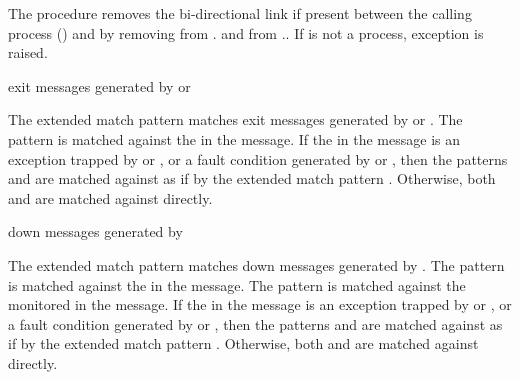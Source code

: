 \begin{procedure}
\end{procedure}
\returns{} 

The  procedure removes the bi-directional link if
present between the calling process () and  by
removing  from . and
 from ..  If  is not
a process, exception  is
raised.

\begin{match-extension}
\end{match-extension}
\matches{} exit messages generated by  or 

The extended match pattern 
matches exit messages generated by  or .
The pattern  is matched against the  in the message.
If the  in the message is
an exception trapped by  or , or
a fault condition generated by  or ,
then the patterns  and  are matched against
 as if by the extended match pattern
.
Otherwise, both  and  are matched against  directly.

\begin{match-extension}
\end{match-extension}
\matches{} down messages generated by 

The extended match pattern 
matches down messages generated by .
The pattern  is matched against the  in the message.
The pattern  is matched against the monitored  in the message.
If the  in the message is
an exception trapped by  or , or
a fault condition generated by  or ,
then the patterns  and  are matched against
 as if by the extended match pattern
.
Otherwise, both  and  are matched against  directly.

